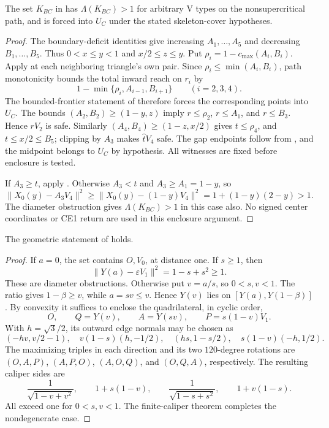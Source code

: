 \begin{lemma}
\label{lem:appendix-fixed-transverse}
The set $K_{BC}$ in  has
$\Lambda(K_{BC})>1$ for arbitrary V types on the nonsupercritical path,
and is forced into $U_C$ under the stated skeleton-cover hypotheses.
\end{lemma}
\begin{proof}
The boundary-deficit identities give increasing $A_1,\ldots,A_5$ and
decreasing $B_1,\ldots,B_5$. Thus $0<x\le y<1$ and $x/2\le z\le y$.
Put $\rho_i=1-c_{\max}(A_i,B_i)$. Apply
 at each neighboring triangle's own pair.
Since $\rho_i\le\min(A_i,B_i)$, path monotonicity bounds the total inward
reach on $r_i$ by
\[
 1-\min\{\rho_i,A_{i-1},B_{i+1}\}\qquad(i=2,3,4).
\]
The bounded-frontier statement of 
therefore forces the corresponding points into $U_C$.
The bounds $(A_2,B_2)\ge(1-y,z)$ imply
$r\le\rho_2$, $r\le A_1$, and $r\le B_3$. Hence $rV_2$ is safe.
Similarly $(A_4,B_4)\ge(1-z,x/2)$ gives $t\le\rho_4$, and
$t\le x/2\le B_5$; clipping by $A_3$ makes $\widehat tV_4$ safe.
The gap endpoints follow from , and the midpoint
belongs to $U_C$ by hypothesis. All witnesses are fixed before enclosure is tested.

If $A_3\ge t$, apply . Otherwise $A_3<t$ and
$A_3\ge A_1=1-y$, so
\[
 \|X_0(y)-A_3V_4\|^2\ge
 \|X_0(y)-(1-y)V_4\|^2=1+(1-y)(2-y)>1.
\]
The diameter obstruction gives $\Lambda(K_{BC})>1$ in this case also.
No signed center coordinates or CE1 return are used in this enclosure argument.
\end{proof}

\begin{lemma}
\label{lem:appendix-fixed-four-point}
The geometric statement of  holds.
\end{lemma}
\begin{proof}
If $a=0$, the set contains $O,V_0$, at distance one. If $s\ge1$, then
\[
 \|Y(a)-\varepsilon V_1\|^2=1-s+s^2\ge1.
\]
These are diameter obstructions. Otherwise put $v=a/s$, so $0<s,v<1$.
The ratio gives $1-\beta\ge v$, while $a=sv\le v$. Hence $Y(v)$ lies
on $[Y(a),Y(1-\beta)]$. By convexity it suffices to enclose the quadrilateral,
in cyclic order,
\[
 O,\qquad Q=Y(v),\qquad A=Y(sv),\qquad P=s(1-v)V_1.
\]
With $h=\sqrt3/2$, its outward edge normals may be chosen as
\[
 (-hv,v/2-1),\quad v(1-s)(h,-1/2),\quad
 (hs,1-s/2),\quad s(1-v)(-h,1/2).
\]
The maximizing triples in each direction and its two $120$-degree rotations
are $(O,A,P)$, $(A,P,O)$, $(A,O,Q)$, and $(O,Q,A)$, respectively.
The resulting caliper sides are
\[
 \frac1{\sqrt{1-v+v^2}},\qquad 1+s(1-v),\qquad
 \frac1{\sqrt{1-s+s^2}},\qquad 1+v(1-s).
\]
All exceed one for $0<s,v<1$. The finite-caliper theorem
 completes the nondegenerate case.
\end{proof}

